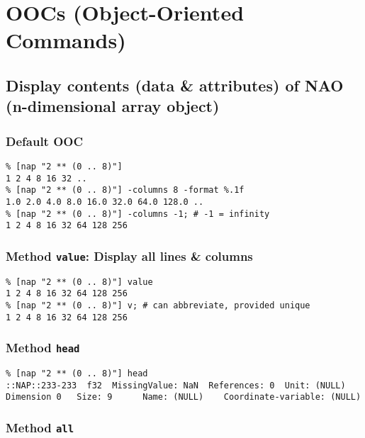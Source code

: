       \section{OOCs (Object-Oriented Commands)}

    \subsection{
      \label{display}Display contents (data \& attributes) of NAO (n-dimensional array object)
    }

    \subsubsection{Default OOC}

    \begin{verbatim}
% [nap "2 ** (0 .. 8)"]
1 2 4 8 16 32 ..
% [nap "2 ** (0 .. 8)"] -columns 8 -format %.1f
1.0 2.0 4.0 8.0 16.0 32.0 64.0 128.0 ..
% [nap "2 ** (0 .. 8)"] -columns -1; # -1 = infinity
1 2 4 8 16 32 64 128 256
\end{verbatim}

    \subsubsection{Method 
    \texttt{value}: Display all lines \& columns}

    \begin{verbatim}
% [nap "2 ** (0 .. 8)"] value
1 2 4 8 16 32 64 128 256
% [nap "2 ** (0 .. 8)"] v; # can abbreviate, provided unique
1 2 4 8 16 32 64 128 256
\end{verbatim}

    \subsubsection{Method 
    \texttt{head}}

    \begin{verbatim}
% [nap "2 ** (0 .. 8)"] head
::NAP::233-233  f32  MissingValue: NaN  References: 0  Unit: (NULL)
Dimension 0   Size: 9      Name: (NULL)    Coordinate-variable: (NULL)
\end{verbatim}

    \subsubsection{Method 
    \texttt{all}}

